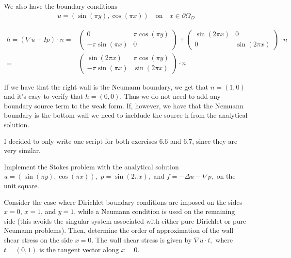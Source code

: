 \documentclass[a4paper,12pt]{article}
\theoremstyle{exerciseStyle}
\theoremstyle{solutionStyle}
\begin{document}
\begin{solution}{6.6}
    We also have the boundary conditions
    \begin{align*}
        u = (\sin(\pi y), \cos(\pi x)) \quad \text{on} \quad x \in \partial \Omega_D
    \end{align*}

    \begin{align*}
        h = (\nabla u + I p)\cdot n = & \begin{pmatrix}
                                            0                & \pi \cos(\pi y) \\
                                            -\pi \sin(\pi x) & 0
                                        \end{pmatrix} +
        \begin{pmatrix}
            \sin(2 \pi x) & 0             \\
            0             & \sin(2 \pi x)
        \end{pmatrix}
        \cdot n                                                            \\
        =                             &
        \begin{pmatrix}
            \sin(2 \pi x)    & \pi \cos(\pi y) \\
            -\pi \sin(\pi x) & \sin(2 \pi x)
        \end{pmatrix} \cdot n
    \end{align*}

    If we have that the right wall is the Neumann boundary, we get that
    \(n = (1,0) \) and it's easy to verify that \(h = (0, 0)\). Thus we
    do not need to add any boundary source term to the weak form.
    If, however, we have that the Nemuann boundary is the bottom wall we need to incldude
    the source h from the analytical solution.

    I decided to only write one script for both exercises 6.6 and 6.7, since they are very similar.
\end{solution}

\begin{exercise}{6.7}
    Implement the Stokes problem with the analytical solution
    \(
    u = \left( \sin(\pi y), \cos(\pi x) \right),
    \)
    \(
    p = \sin(2\pi x),
    \)
    and
    \(
    f = -\Delta u - \nabla p,
    \)
    on the unit square.

    Consider the case where Dirichlet boundary conditions are imposed on the sides \(x=0\), \(x=1\), and \(y=1\), while a Neumann condition is used on the remaining side (this avoids the singular system associated with either pure Dirichlet or pure Neumann problems). Then, determine the order of approximation of the wall shear stress on the side \(x=0\). The wall shear stress is given by
    \(
    \nabla u \cdot t,
    \)
    where \(t = (0,1)\) is the tangent vector along \(x=0\).
\end{exercise}
\end{document}
